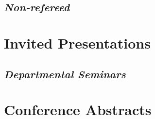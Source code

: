 \documentclass[12pt,a4paper,sans]{moderncv}        %
\begin{document}
\renewcommand*{\bibliographyhead}[1]{\subsection{Non-refereed}}
\subsection{\textit{Non-refereed}}

\section{Invited Presentations}
\renewcommand*{\bibliographyhead}[1]{}

\renewcommand*{\bibliographyhead}[1]{\subsection{Departmental Seminars}}
\subsection{\textit{Departmental Seminars}}

\section{Conference Abstracts}
\renewcommand*{\bibliographyhead}[1]{}

\end{document}

